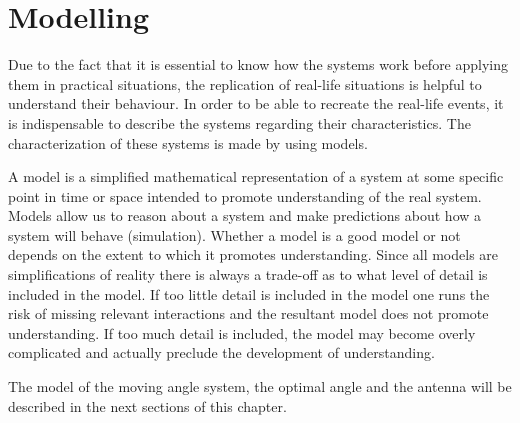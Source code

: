 \chapter{Modelling}\label{ch:model}

Due to the fact that it is essential to know how the systems work before applying them in practical situations, the replication of real-life situations is helpful to understand their behaviour. In order to be able to recreate the real-life events, it is indispensable to describe the systems regarding their characteristics. The characterization of these systems is made by using models.  

A model is a simplified mathematical representation of a system at some specific point in time or space intended to promote understanding of the real system. Models allow us to reason about a system and make predictions about how a system will behave (simulation). Whether a model is a good model or not depends on the extent to which it promotes understanding. Since all models are simplifications of reality there is always a trade-off as to what level of detail is included in the model. If too little detail is included in the model one runs the risk of missing relevant interactions and the resultant model does not promote understanding. If too much detail is included, the model may become overly complicated and actually preclude the development of understanding. 

The model of the moving angle system, the optimal angle and the antenna will be described in the next sections of this chapter.